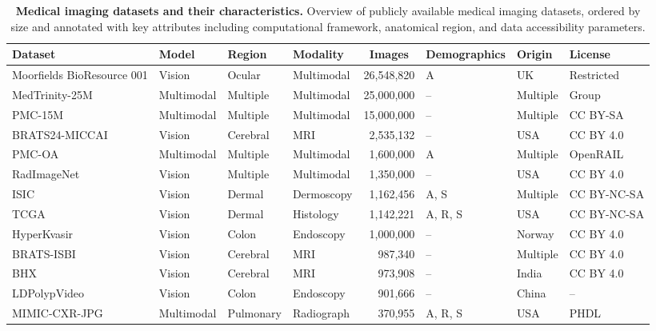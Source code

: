 \begin{table*}[t]
\small
\setlength{\tabcolsep}{5pt}
\caption{\textbf{Medical imaging datasets and their characteristics.} Overview of publicly available medical imaging datasets, ordered by size and annotated with key attributes including computational framework, anatomical region, and data accessibility parameters.}
\label{tab:medical-datasets}
\begin{tabular}{l l l l r l l l}
\toprule
Dataset & Model & Region & Modality & \multicolumn{1}{c}{Images} & Demographics & Origin & License \\
\midrule
Moorfields BioResource 001 \cite{health_data_research_innovation_gateway_moorfields_2024} & Vision & Ocular & Multimodal & 26,548,820 & A & UK & Restricted \\
MedTrinity-25M\cite{xie_medtrinity-25m_2024} & Multimodal & Multiple & Multimodal & 25,000,000 & -- & Multiple & Group \\
PMC-15M\cite{zhang_biomedclip_2025} & Multimodal & Multiple & Multimodal & 15,000,000 & -- & Multiple & CC BY-SA \\
BRATS24-MICCAI\cite{verdier_2024_2024} & Vision & Cerebral & MRI & 2,535,132 & -- & USA & CC BY 4.0 \\
PMC-OA\cite{lin_pmc-clip_2023} & Multimodal & Multiple & Multimodal & 1,600,000 & A & Multiple & OpenRAIL \\
RadImageNet\cite{mei_radimagenet_2022} & Vision & Multiple & Multimodal & 1,350,000 & -- & USA & CC BY 4.0 \\
ISIC\cite{zawacki_siim-isic_2020} & Vision & Dermal & Dermoscopy & 1,162,456 & A, S & Multiple & CC BY-NC-SA \\
TCGA\cite{kawai_large-scale_2023} & Vision & Dermal & Histology & 1,142,221 & A, R, S & USA & CC BY-NC-SA \\
HyperKvasir\cite{borgli_hyperkvasir_2020} & Vision & Colon & Endoscopy & 1,000,000 & -- & Norway & CC BY 4.0 \\
BRATS-ISBI\cite{karargyris_federated_2023} & Vision & Cerebral & MRI & 987,340 & -- & Multiple & CC BY 4.0 \\
BHX\cite{reis_brain_nodate} & Vision & Cerebral & MRI & 973,908 & -- & India & CC BY 4.0 \\
LDPolypVideo\cite{ma_ldpolypvideo_2021} & Vision & Colon & Endoscopy & 901,666 & -- & China & -- \\
MIMIC-CXR-JPG\cite{johnson_mimic-cxr-jpg_2019} & Multimodal & Pulmonary & Radiograph & 370,955 & A, R, S & USA & PHDL \\

\end{tabular}
\end{table*}
